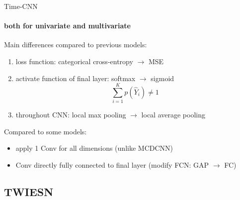 \documentclass[aspectratio=169]{ctexbeamer}
\begin{document}
\begin{frame}{Time-CNN }
	\framesubtitle{both for univariate and multivariate}
	Main differences compared to previous models:
	\begin{enumerate}
		\item loss function: categorical cross-entropy $\to$ MSE
		\item activate function of final layer: softmax $\to$ sigmoid
			$$\sum_{i=1}^{K}{p(\hat Y_{i})} \ne 1$$
		\item throughout CNN: local max pooling $\to$ local average pooling
	\end{enumerate}
	Compared to some models:
	\begin{itemize}
		\item apply 1 Conv for all dimensions (unlike MCDCNN)
		\item Conv directly fully connected to final layer (modify FCN: GAP $\to$ FC)
	\end{itemize}

\end{frame}

\subsection{TWIESN}
\end{document}
